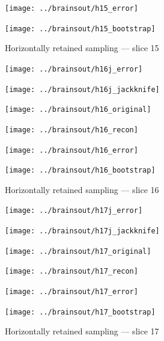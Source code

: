 \documentclass[article]{jdssv}
\begin{document}
\begin{appendix}
\begin{figure}
\begin{centering}
\parbox{\imsize}{\texttt{[image: ../brainsout/h15\_error]}}
\parbox{\imsize}{\texttt{[image: ../brainsout/h15\_bootstrap]}}

\end{centering}
\caption{Horizontally retained sampling --- slice 15}
\end{figure}


\begin{figure}
\begin{centering}

\parbox{\imsize}{\texttt{[image: ../brainsout/h16j\_error]}}
\parbox{\imsize}{\texttt{[image: ../brainsout/h16j\_jackknife]}}

\vspace{\vertsep}

\parbox{\imsize}{\texttt{[image: ../brainsout/h16\_original]}}
\parbox{\imsize}{\texttt{[image: ../brainsout/h16\_recon]}}

\vspace{\vertsep}

\parbox{\imsize}{\texttt{[image: ../brainsout/h16\_error]}}
\parbox{\imsize}{\texttt{[image: ../brainsout/h16\_bootstrap]}}

\end{centering}
\caption{Horizontally retained sampling --- slice 16}
\end{figure}


\begin{figure}
\begin{centering}

\parbox{\imsize}{\texttt{[image: ../brainsout/h17j\_error]}}
\parbox{\imsize}{\texttt{[image: ../brainsout/h17j\_jackknife]}}

\vspace{\vertsep}

\parbox{\imsize}{\texttt{[image: ../brainsout/h17\_original]}}
\parbox{\imsize}{\texttt{[image: ../brainsout/h17\_recon]}}

\vspace{\vertsep}

\parbox{\imsize}{\texttt{[image: ../brainsout/h17\_error]}}
\parbox{\imsize}{\texttt{[image: ../brainsout/h17\_bootstrap]}}

\end{centering}
\caption{Horizontally retained sampling --- slice 17}
\end{figure}


\begin{figure}
\begin{centering}


\end{centering}
\end{figure}
\end{appendix}
\end{document}

